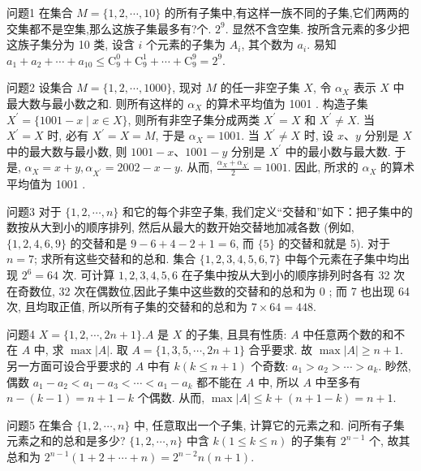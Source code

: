 
问题1 在集合 $M=\{1,2, \cdots, 10\}$ 的所有子集中,有这样一族不同的子集,它们两两的交集都不是空集,那么这族子集最多有?个.
$2^9$. 显然不含空集.
按所含元素的多少把这族子集分为 10 类, 设含 $i$ 个元素的子集为 $A_i$, 其个数为 $a_i$. 易知 $a_1+a_2+\cdots+a_{10} \leqslant \mathrm{C}_9^0+\mathrm{C}_9^1+\cdots+\mathrm{C}_9^9=2^9$.



问题2 设集合 $M=\{1,2, \cdots, 1000\}$, 现对 $M$ 的任一非空子集 $X$, 令 $\alpha_X$ 表示 $X$ 中最大数与最小数之和.
则所有这样的 $\alpha_X$ 的算术平均值为
1001 . 构造子集 $X^{\prime}=\{1001-x \mid x \in X\}$, 则所有非空子集分成两类 $X^{\prime}=X$ 和 $X^{\prime} \neq X$. 当 $X^{\prime}=X$ 时, 必有 $X^{\prime}=X=M$, 于是 $\alpha_X=1001$. 当 $X^{\prime} \neq X$ 时, 设 $x 、 y$ 分别是 $X$ 中的最大数与最小数, 则 $1001-x 、 1001-y$ 分别是 $X^{\prime}$ 中的最小数与最大数.
于是, $\alpha_X=x+y, \alpha_{X^{\prime}}=2002-x-y$. 从而, $\frac{\alpha_X+\alpha_{X^{\prime}}}{2}=1001$. 因此, 所求的 $\alpha_X$ 的算术平均值为 1001 .



问题3 对于 $\{1,2, \cdots, n\}$ 和它的每个非空子集, 我们定义“交替和”如下：把子集中的数按从大到小的顺序排列, 然后从最大的数开始交替地加减各数 (例如, $\{1,2,4,6,9\}$ 的交替和是 $9-6+4-2+1=6$, 而 $\{5\}$ 的交替和就是 5). 对于 $n=7$; 求所有这些交替和的总和.
集合 $\{1,2,3,4,5,6,7\}$ 中每个元素在子集中均出现 $2^6=64$ 次.
可计算 $1,2,3,4,5,6$ 在子集中按从大到小的顺序排列时各有 32 次在奇数位, 32 次在偶数位,因此子集中这些数的交替和的总和为 0 ; 而 7 也出现 64 次, 且均取正值, 所以所有子集的交替和的总和为 $7 \times 64=448$.



问题4 $X=\{1,2, \cdots, 2 n+1\} . A$ 是 $X$ 的子集, 且具有性质: $A$ 中任意两个数的和不在 $A$ 中, 求 $\max |A|$.
取 $A=\{1,3,5, \cdots, 2 n+1\}$ 合乎要求.
故 $\max |A| \geqslant n+1$. 另一方面可设合乎要求的 $A$ 中有 $k(k \leqslant n+1)$ 个奇数: $a_1>a_2>\cdots>a_k$. 眇然,偶数 $a_1-a_2<a_1-a_3<\cdots<a_1-a_k$ 都不能在 $A$ 中, 所以 $A$ 中至多有 $n-(k-1) =n+1-k$ 个偶数.
从而, $\max |A| \leqslant k+(n+1-k)=n+1$.



问题5 在集合 $\{1,2, \cdots, n\}$ 中, 任意取出一个子集, 计算它的元素之和.
问所有子集元素之和的总和是多少?
$\{1,2, \cdots, n\}$ 中含 $k(1 \leqslant k \leqslant n)$ 的子集有 $2^{n-1}$ 个, 故其总和为 $2^{n-1}(1+2+\cdots+n)=2^{n-2} n(n+1)$.



